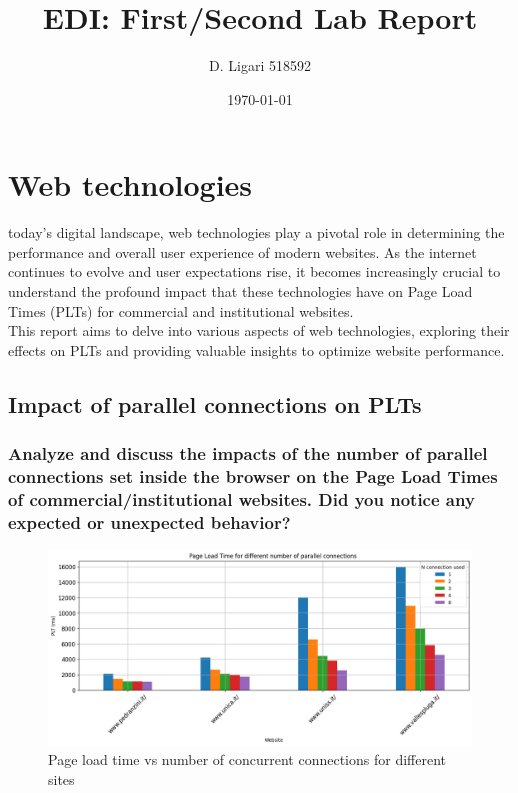 \documentclass[eng]{class}
\title{EDI: First/Second Lab Report}
\author[1]{D. Ligari 518592}
\affil[1]{University of Pavia, Department of Computer Engineering (Data Science), Pavia, Italy}
\date{\today}
\begin{document}
\maketitle
\tableofcontents
\thispagestyle{FirstPage}
\section{Web technologies}
today's digital landscape, web technologies play a pivotal role in determining the performance and overall user experience of modern websites.
As the internet continues to evolve and user expectations rise, it becomes increasingly crucial to understand the profound impact
that these technologies have on Page Load Times (PLTs) for commercial and institutional websites.\\
This report aims to delve into various aspects of web technologies,
exploring their effects on PLTs and providing valuable insights to optimize website performance.

\subsection{Impact of parallel connections on PLTs}
\subsubsection*{Analyze and discuss the impacts of the number of parallel connections set inside the browser
  on the Page Load Times of commercial/institutional websites. Did you notice any expected or
  unexpected behavior?}

\begin{figure}[H]
  \centering
  \includegraphics[width=\columnwidth]{images/plt_vs_conc_1.1.png}
  \caption{Page load time vs number of concurrent connections for different sites}
  \label{fig-1}
\end{figure}
\end{document}
